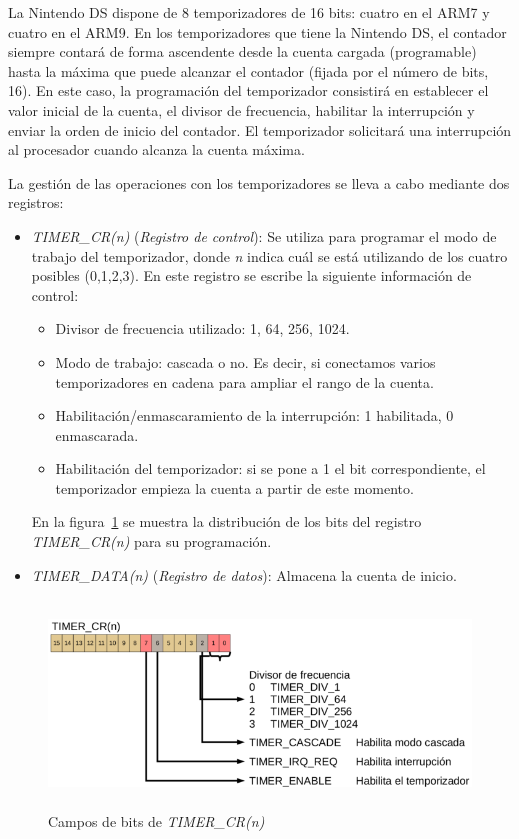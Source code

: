 La Nintendo DS dispone de 8 temporizadores de 16 bits: cuatro en el ARM7 y cuatro en el ARM9. En los temporizadores que tiene la Nintendo DS, el contador siempre contará  de forma ascendente desde la cuenta cargada (programable)  hasta la máxima que puede alcanzar el contador (fijada por el número de bits, 16). En este caso, la programación del temporizador consistirá en establecer el valor inicial de la cuenta, el divisor de frecuencia, habilitar la interrupción y enviar la orden de  inicio del contador. El temporizador  solicitará una interrupción al procesador cuando alcanza la cuenta máxima.

La gestión de las operaciones con los  temporizadores se lleva a cabo mediante dos registros:

\begin{itemize}
	\item \textit{TIMER\_CR(n)} (\textit{Registro de control}): Se utiliza para programar el modo de trabajo del temporizador, donde \textit{n} indica cuál se está utilizando de los cuatro posibles (0,1,2,3). En este registro se escribe la siguiente información de control:
	\begin{itemize}
		\item Divisor de frecuencia utilizado: 1, 64, 256, 1024.
		\item Modo de trabajo: cascada o no. Es decir, si conectamos varios temporizadores en cadena para ampliar el rango de la cuenta. 
		\item Habilitación/enmascaramiento de  la interrupción: 1 habilitada, 0 enmascarada.
		\item Habilitación del temporizador: si se pone a 1 el bit correspondiente, el temporizador empieza la cuenta a partir de este momento.
	\end{itemize}
	En la figura~\ref{fig_p2_c2_timer-control} se muestra la distribución de los bits del registro \textit{TIMER\_CR(n)} para su programación. 
	\item \textit{TIMER\_DATA(n)} (\textit{Registro de datos}): Almacena la cuenta de inicio. 
\end{itemize}


\begin{figure}[h]
	\centering
	\includegraphics[height=5.5cm]{./Figuras/C9/c9_timer.PNG}
	\caption{ Campos de bits de \textit{TIMER\_CR(n)}}
	\label{fig_p2_c2_timer-control}
\end{figure}

